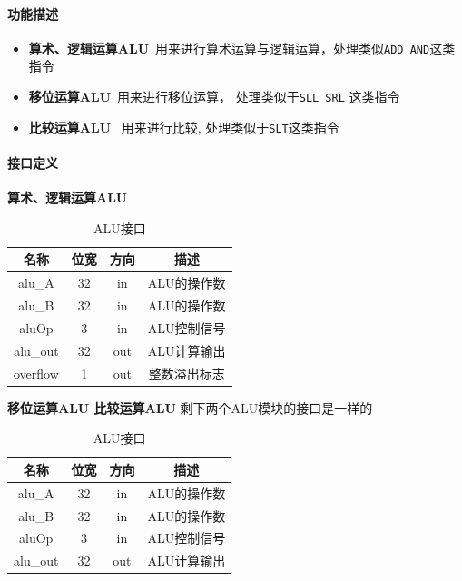 \documentclass[UTF8]{ctexart}
\begin{document}
\paragraph{功能描述}
\begin{itemize}
    \item \textbf{算术、逻辑运算ALU}\  用来进行算术运算与逻辑运算，处理类似\texttt{ADD AND}这类指令
    \item \textbf{移位运算ALU}\  用来进行移位运算， 处理类似于\texttt{SLL SRL} 这类指令 
    \item \textbf{比较运算ALU} \ 用来进行比较, 处理类似于\texttt{SLT}这类指令
\end{itemize}
\paragraph{接口定义}
\textbf{算术、逻辑运算ALU}
\begin{table}[h]
    \centering
    \begin{tabular}{|c|c|c|c|}
        \hline  
        名称 & 位宽 & 方向 & 描述 \\
        \hline  
        alu\_A & 32 & in & ALU的操作数 \\
        \hline 
        alu\_B & 32 & in & ALU的操作数 \\
        \hline 
        aluOp & 3 & in & ALU控制信号 \\
        \hline
        alu\_out & 32 & out & ALU计算输出 \\
        \hline
        overflow & 1 & out & 整数溢出标志 \\
        \hline
    \end{tabular}
    \caption{ALU接口}
\end{table}

\textbf{移位运算ALU 比较运算ALU}
剩下两个ALU模块的接口是一样的
\begin{table}[h]
    \centering
    \begin{tabular}{|c|c|c|c|}
        \hline  
        名称 & 位宽 & 方向 & 描述 \\
        \hline  
        alu\_A & 32 & in & ALU的操作数 \\
        \hline 
        alu\_B & 32 & in & ALU的操作数 \\
        \hline 
        aluOp & 3 & in & ALU控制信号 \\
        \hline
        alu\_out & 32 & out & ALU计算输出 \\
        \hline

    \end{tabular}
    \caption{ALU接口}
\end{table}
\end{document}
